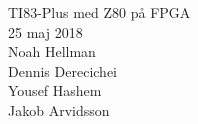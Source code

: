 \documentclass[main.tex]{subfiles}
\begin{document}
\begin{center}
\vspace*{15mm}
{\Huge TI83-Plus med Z80 på FPGA}\\
\vspace{15mm}
{\large 25 maj 2018}\\
\vspace{15mm}
    Noah Hellman\\
    Dennis Derecichei\\
    Yousef Hashem\\
    Jakob Arvidsson\\
\end{center}
\vspace{2cm}
\clearpage
\end{document}
